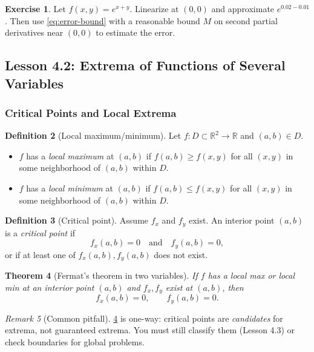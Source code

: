 \documentclass[12pt]{article}
\numberwithin{equation}{section}
\newcommand{\RR}{\mathbb{R}}
\theoremstyle{plain}
\newtheorem{theorem}{Theorem}[section]
\theoremstyle{definition}
\newtheorem{definition}[theorem]{Definition}
\newtheorem{exercise}[theorem]{Exercise}
\theoremstyle{remark}
\newtheorem{remark}[theorem]{Remark}
\begin{document}
\begin{exercise}
Let $f(x,y)=e^{x+y}$. Linearize at $(0,0)$ and approximate $e^{0.02-0.01}$.  
Then use \cref{eq:error-bound} with a reasonable bound $M$ on second partial derivatives near $(0,0)$ to estimate the error.
\end{exercise}

\subsection{Lesson 4.2: Extrema of Functions of Several Variables}

\subsubsection{Critical Points and Local Extrema}

\begin{definition}[Local maximum/minimum]\label{def:local-extrema}
Let $f:D\subset\RR^2\to\RR$ and $(a,b)\in D$.
\begin{itemize}
\item $f$ has a \emph{local maximum} at $(a,b)$ if $f(a,b)\ge f(x,y)$ for all $(x,y)$ in some neighborhood of $(a,b)$ within $D$.
\item $f$ has a \emph{local minimum} at $(a,b)$ if $f(a,b)\le f(x,y)$ for all $(x,y)$ in some neighborhood of $(a,b)$ within $D$.
\end{itemize}
\end{definition}

\begin{definition}[Critical point]\label{def:critical}
Assume $f_x$ and $f_y$ exist. An interior point $(a,b)$ is a \emph{critical point} if
\[
f_x(a,b)=0 \quad \text{and}\quad f_y(a,b)=0,
\]
or if at least one of $f_x(a,b),f_y(a,b)$ does not exist.
\end{definition}

\begin{theorem}[Fermat's theorem in two variables]\label{thm:fermat}
If $f$ has a local max or local min at an interior point $(a,b)$ and $f_x,f_y$ exist at $(a,b)$, then
\[
f_x(a,b)=0,\qquad f_y(a,b)=0.
\]
\end{theorem}

\begin{remark}[Common pitfall]
\cref{thm:fermat} is one-way: critical points are \emph{candidates} for extrema, not guaranteed extrema.  
You must still classify them (Lesson 4.3) or check boundaries for global problems.
\end{remark}
\end{document}
